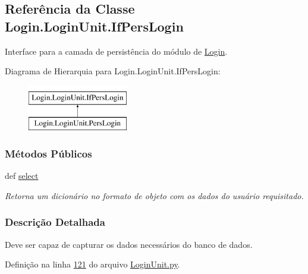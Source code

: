 \hypertarget{classLogin_1_1LoginUnit_1_1IfPersLogin}{\subsection{Referência da Classe Login.\-Login\-Unit.\-If\-Pers\-Login}
\label{classLogin_1_1LoginUnit_1_1IfPersLogin}
}


Interface para a camada de persistência do módulo de \hyperlink{namespaceLogin}{Login}.  


Diagrama de Hierarquia para Login.\-Login\-Unit.\-If\-Pers\-Login\-:\begin{figure}[H]
\begin{center}
\leavevmode
\includegraphics[height=2.000000cm]{da/dc3/classLogin_1_1LoginUnit_1_1IfPersLogin}
\end{center}
\end{figure}
\subsubsection*{Métodos Públicos}
\begin{DoxyCompactItemize}
\item 
def \hyperlink{classLogin_1_1LoginUnit_1_1IfPersLogin_a24648e1c42d0762277b5b7aa641fa575}{select}
\begin{DoxyCompactList}\small\item\em Retorna um dicionário no formato de objeto com os dados do usuário requisitado. \end{DoxyCompactList}\end{DoxyCompactItemize}


\subsubsection{Descrição Detalhada}
Deve ser capaz de capturar os dados necessários do banco de dados. 

Definição na linha \hyperlink{LoginUnit_8py_source_l00121}{121} do arquivo \hyperlink{LoginUnit_8py_source}{Login\-Unit.\-py}.




